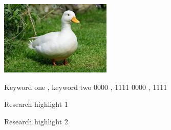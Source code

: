 \documentclass[review,12pt,authoryear]{elsarticle}
\begin{document}
\begin{linenumbers}
\begin{frontmatter}
      \begin{graphicalabstract}
        \includegraphics{graphical_abstract.jpeg}
      \end{graphicalabstract}

      \begin{keyword}
      Keyword one \sep{} keyword two
      \PACS{} 0000 \sep{} 1111
      \MSC{} 0000 \sep{} 1111
      \end{keyword}
      

      \begin{highlights}
        \item Research highlight 1
        \item Research highlight 2
        \end{highlights}

      \end{frontmatter}



\end{linenumbers}
\end{document}
